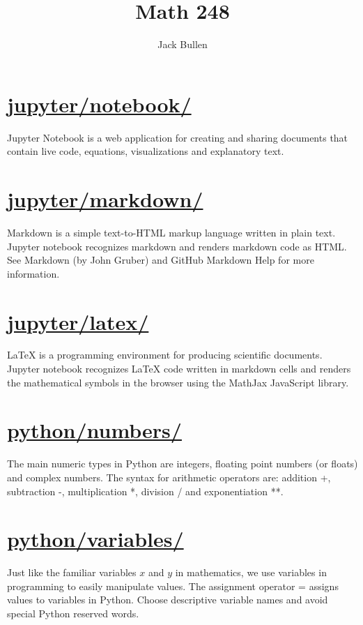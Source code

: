 \documentclass[12pt]{article}
\title{Math 248}
\author{Jack Bullen}
\begin{document}
\maketitle
\section{\href{https://patrickwalls.github.io/mathematicalpython/jupyter/notebook/}{jupyter/notebook/}}
Jupyter Notebook is a web application for creating and sharing documents that contain live code, equations, visualizations and explanatory text.
\vspace{1cm}
\section{\href{https://patrickwalls.github.io/mathematicalpython/jupyter/markdown/}{jupyter/markdown/}}
Markdown is a simple text-to-HTML markup language written in plain text. Jupyter notebook recognizes markdown and renders markdown code as HTML. See Markdown (by John Gruber) and GitHub Markdown Help for more information.
\vspace{1cm}
\section{\href{https://patrickwalls.github.io/mathematicalpython/jupyter/latex/}{jupyter/latex/}}
LaTeX is a programming environment for producing scientific documents. Jupyter notebook recognizes LaTeX code written in markdown cells and renders the mathematical symbols in the browser using the MathJax JavaScript library.
\vspace{1cm}
\section{\href{https://patrickwalls.github.io/mathematicalpython/python/numbers/}{python/numbers/}}
The main numeric types in Python are integers, floating point numbers (or floats) and complex numbers. The syntax for arithmetic operators are: addition +, subtraction -, multiplication *, division / and exponentiation **.
\vspace{1cm}
\section{\href{https://patrickwalls.github.io/mathematicalpython/python/variables/}{python/variables/}}
Just like the familiar variables $x$ and $y$ in mathematics, we use variables in programming to easily manipulate values. The assignment operator = assigns values to variables in Python. Choose descriptive variable names and avoid special Python reserved words.
\vspace{1cm}
\end{document}

